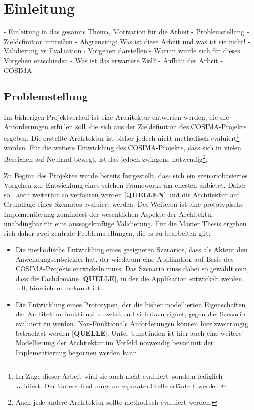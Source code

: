 
\chapter{Einleitung} %
\label{cha:einleitung}

- Einleitung in das gesamte Thema, Motivation für die Arbeit
- Problemstellung
- Zieldefinition umreißen
- Abgrenzung: Was ist diese Arbeit und was ist sie nicht!
- Validierung vs Evaluation
- Vorgehen darstellen
- Warum wurde sich für dieses Vorgehen entschieden
- Was ist das erwartete Ziel?
- Aufbau der Arbeit
- COSIMA

\section{Problemstellung} %
\label{sec:problemstellung}

  Im bisherigen Projektverlauf ist eine Architektur entworfen worden, die die Anforderungen erfüllen soll, die sich aus der Zieldefinition des COSIMA-Projekts ergeben. Die erstellte Architektur ist bisher jedoch nicht methodisch evaluiert\footnote{Im Zuge dieser Arbeit wird sie auch nicht evaluiert, sondern lediglich validiert. Der Unterschied muss an separater Stelle erläutert werden.} worden. Für die weitere Entwicklung des COSIMA-Projekts, dass sich in vielen Bereichen auf Neuland bewegt, ist das jedoch zwingend notwendig\footnote{Auch jede andere Architektur sollte methodisch evaluiert werden.}.
  
  Zu Beginn des Projektes wurde bereits festgestellt, dass sich ein szenariobasiertes Vorgehen zur Entwicklung eines solchen Frameworks am ehesten anbietet. Daher soll auch weiterhin so verfahren werden [\textbf{QUELLEN}] und die Architektur auf Grundlage eines Szenarios evaluiert werden. Des Weiteren ist eine prototypische Implementierung zumindest der wesentlichen Aspekte der Architektur unabdingbar für eine aussagekräftige Validierung. Für die Master Thesis ergeben sich daher zwei zentrale Problemstellungen, die es zu bearbeiten gilt:
  
  \begin{itemize}
    \item Die methodische Entwicklung eines geeigneten Szenarios, dass als Akteur den Anwendungsentwickler hat, der wiederum eine Applikation auf Basis des COSIMA-Projekts entwickeln muss. Das Szenario muss dabei so gewählt sein, dass die Fachdomäne [\textbf{QUELLE}], in der die Applikation entwickelt werden soll, hinreichend bekannt ist.
    \item Die Entwicklung eines Prototypen, der die bisher modellierten Eigenschaften der Architektur funktional umsetzt und sich dazu eignet, gegen das Szenario evaluiert zu werden. Non-Funktionale Anforderungen können hier zweitrangig betrachtet werden [\textbf{QUELLE}]. Unter Umständen ist hier auch eine weitere Modellierung der Architektur im Vorfeld notwendig bevor mit der Implementierung begonnen werden kann.
  \end{itemize}

